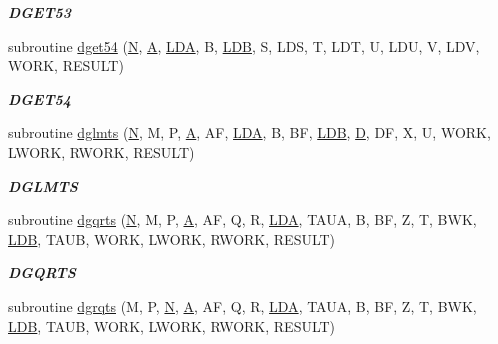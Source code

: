 \begin{DoxyCompactItemize}
\begin{DoxyCompactList}\small\item\em {\bfseries D\+G\+E\+T53} \end{DoxyCompactList}\item 
subroutine \hyperlink{group__double__eig_ga14537b71a6ca0def78c7edf19acfa8f4}{dget54} (\hyperlink{polmisc_8c_a0240ac851181b84ac374872dc5434ee4}{N}, \hyperlink{classA}{A}, \hyperlink{example__user_8c_ae946da542ce0db94dced19b2ecefd1aa}{L\+D\+A}, B, \hyperlink{example__user_8c_a50e90a7104df172b5a89a06c47fcca04}{L\+D\+B}, S, L\+D\+S, T, L\+D\+T, U, L\+D\+U, V, L\+D\+V, W\+O\+R\+K, R\+E\+S\+U\+L\+T)
\begin{DoxyCompactList}\small\item\em {\bfseries D\+G\+E\+T54} \end{DoxyCompactList}\item 
subroutine \hyperlink{group__double__eig_gadb6ee09a4853bbafa0ad4b5f5dd26f32}{dglmts} (\hyperlink{polmisc_8c_a0240ac851181b84ac374872dc5434ee4}{N}, M, P, \hyperlink{classA}{A}, A\+F, \hyperlink{example__user_8c_ae946da542ce0db94dced19b2ecefd1aa}{L\+D\+A}, B, B\+F, \hyperlink{example__user_8c_a50e90a7104df172b5a89a06c47fcca04}{L\+D\+B}, \hyperlink{odrpack_8h_a7dae6ea403d00f3687f24a874e67d139}{D}, D\+F, X, U, W\+O\+R\+K, L\+W\+O\+R\+K, R\+W\+O\+R\+K, R\+E\+S\+U\+L\+T)
\begin{DoxyCompactList}\small\item\em {\bfseries D\+G\+L\+M\+T\+S} \end{DoxyCompactList}\item 
subroutine \hyperlink{group__double__eig_ga73c45f96f24770b97239b6269c8d1cdd}{dgqrts} (\hyperlink{polmisc_8c_a0240ac851181b84ac374872dc5434ee4}{N}, M, P, \hyperlink{classA}{A}, A\+F, Q, R, \hyperlink{example__user_8c_ae946da542ce0db94dced19b2ecefd1aa}{L\+D\+A}, T\+A\+U\+A, B, B\+F, Z, T, B\+W\+K, \hyperlink{example__user_8c_a50e90a7104df172b5a89a06c47fcca04}{L\+D\+B}, T\+A\+U\+B, W\+O\+R\+K, L\+W\+O\+R\+K, R\+W\+O\+R\+K, R\+E\+S\+U\+L\+T)
\begin{DoxyCompactList}\small\item\em {\bfseries D\+G\+Q\+R\+T\+S} \end{DoxyCompactList}\item 
subroutine \hyperlink{group__double__eig_ga7407f6eaf402bcb6bbda3e5bd46485fa}{dgrqts} (M, P, \hyperlink{polmisc_8c_a0240ac851181b84ac374872dc5434ee4}{N}, \hyperlink{classA}{A}, A\+F, Q, R, \hyperlink{example__user_8c_ae946da542ce0db94dced19b2ecefd1aa}{L\+D\+A}, T\+A\+U\+A, B, B\+F, Z, T, B\+W\+K, \hyperlink{example__user_8c_a50e90a7104df172b5a89a06c47fcca04}{L\+D\+B}, T\+A\+U\+B, W\+O\+R\+K, L\+W\+O\+R\+K, R\+W\+O\+R\+K, R\+E\+S\+U\+L\+T)

\end{DoxyCompactItemize}
